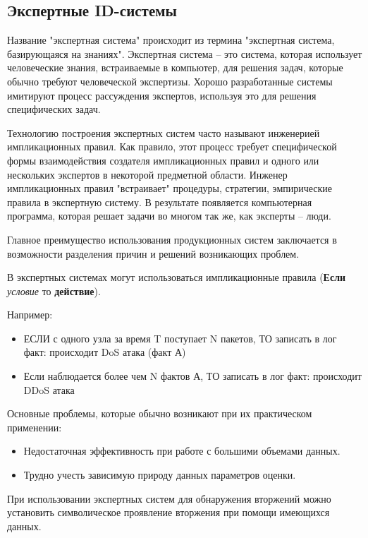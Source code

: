 \subsection{Экспертные ID-системы}

Название "экспертная система" происходит из термина "экспертная система, базирующаяся на знаниях". Экспертная система – это система, которая использует человеческие знания, встраиваемые в компьютер, для решения задач, которые обычно требуют человеческой экспертизы. Хорошо разработанные системы имитируют процесс рассуждения экспертов, используя это для решения специфических задач.

Технологию построения экспертных систем часто называют инженерией импликационных правил. Как правило,
этот процесс требует специфической формы взаимодействия создателя импликационных правил и одного
или нескольких экспертов в некоторой предметной области. Инженер импликационных правил "встраивает"
процедуры, стратегии, эмпирические правила в экспертную систему. В результате появляется
компьютерная программа, которая решает задачи во многом так же, как эксперты -- люди.
\autocite{IDSystem}

Главное преимущество использования продукционных систем заключается в возможности разделения причин и
решений возникающих проблем.

В экспертных системах могут использоваться импликационные правила (\textbf{Если} \textit{условие} то
\textbf{действие}).

Например:
\begin{itemize}
	\item ЕСЛИ с одного узла за время T поступает N пакетов, ТО записать в лог факт:
	происходит DoS атака (факт А)

	\item Если наблюдается более чем N фактов А, ТО записать в лог факт: происходит DDoS атака
\end{itemize}

Основные проблемы, которые обычно возникают при их практическом применении:
\begin{itemize}
    \item Недостаточная эффективность при работе с большими объемами данных.
    \item Трудно учесть зависимую природу данных параметров оценки.
\end{itemize}

При использовании экспертных систем для обнаружения вторжений можно установить символическое
проявление вторжения при помощи имеющихся данных.

